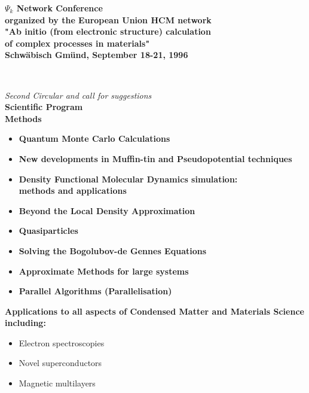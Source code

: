{%
%
\parbox[t]{15cm}{{\Huge\bf $\Psi_k$ Network Conference}\\[3mm]
{\bf  organized by the European Union HCM network}\\[3mm]
{\Large\bf"Ab initio (from electronic structure) calculation\\
of complex processes in materials"\\[6mm] {\large\bf Schw\"abisch Gm\"und,  September 18-21, 1996}}}\\[5mm]
\par
{\huge\em Second Circular and call for suggestions}\\[5mm]
{\Large\bf Scientific Program}\\[5mm]
{\bf Methods}\\
\begin{itemize}
\item {\bf Quantum Monte Carlo Calculations }
\item {\bf New developments in Muffin-tin and Pseudopotential techniques }
\item {\bf Density Functional Molecular Dynamics simulation:\\ methods and applications}
\item {\bf Beyond the Local Density Approximation}
\item {\bf Quasiparticles}
\item {\bf Solving the Bogolubov-de Gennes Equations }
\item {\bf Approximate Methods for large systems}
\item {\bf Parallel Algorithms (Parallelisation)}\\[3mm]
\end{itemize}
{\bf Applications to all aspects of Condensed Matter and Materials Science including:}\\
\begin{itemize}
\item Electron spectroscopies
\item Novel superconductors
\item Magnetic multilayers

\end{itemize}}
